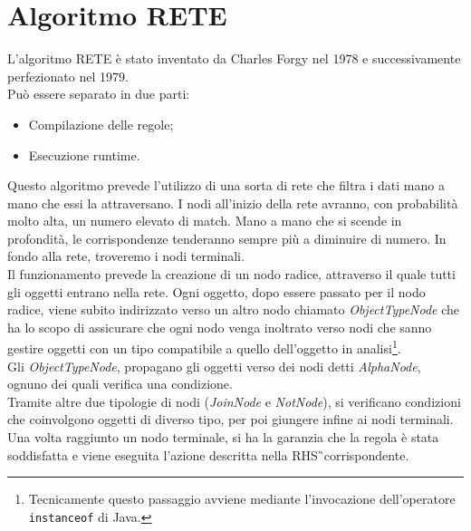 \section{Algoritmo RETE}
 \label{App:AppendiceAlgoritmoRete}
 	L'algoritmo RETE è stato inventato da Charles Forgy nel 1978 e successivamente perfezionato nel 1979. \\
 	Può essere separato in due parti:
 	\begin{itemize}
 		\item Compilazione delle regole;
 		\item Esecuzione runtime.
 	\end{itemize}
 	Questo algoritmo prevede l'utilizzo di una sorta di rete che filtra i dati mano a mano che essi la attraversano. I nodi all'inizio della rete avranno, con probabilità molto alta, un numero elevato di match. 
 	Mano a mano che si scende in profondità, le corrispondenze tenderanno sempre più a diminuire di numero. In fondo alla rete, troveremo i nodi terminali. \\
 	Il funzionamento prevede la creazione di un nodo radice, attraverso il quale tutti gli oggetti entrano nella rete. Ogni oggetto, dopo essere passato per il nodo radice, viene subito indirizzato verso un altro nodo chiamato \textit{ObjectTypeNode} che ha lo scopo di assicurare che ogni nodo venga inoltrato verso nodi che sanno gestire oggetti con un tipo compatibile a quello dell'oggetto in analisi\footnote{Tecnicamente questo passaggio avviene mediante l'invocazione dell'operatore \texttt{instanceof} di Java.}.\\
 	Gli \textit{ObjectTypeNode},  propagano gli oggetti verso dei nodi detti \textit{AlphaNode}, ognuno dei quali verifica una condizione. \\
 	Tramite altre due tipologie di nodi (\textit{JoinNode} e \textit{NotNode}), si verificano condizioni che coinvolgono oggetti di diverso tipo, per poi giungere infine ai nodi terminali. \\
 	Una volta raggiunto un nodo terminale, si ha la garanzia che la regola è stata soddisfatta e viene eseguita l'azione descritta nella \gls{RHS}\G\ corrispondente.
 	
